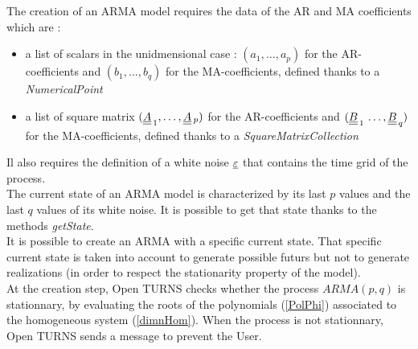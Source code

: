 \renewcommand{\filename}{docUC_StocProc_ARMA_Creation.tex}
\renewcommand{\filetitle}{UC : Creation of an ARMA model}

\HeaderIIILevel

\label{ARMACreation}






The creation of an ARMA model requires the data of the AR and MA coefficients which are : 
\begin{itemize}
\item a list of scalars in the unidmensional case : $(a_1, \hdots, a_p)$ for the AR-coefficients and  $(b_1, \hdots, b_q)$ for the MA-coefficients, defined thanks to a \emph{NumericalPoint}
\item a list of square matrix $( {\underline{\underline{A}}}_{\, 1}, \hdots, {\underline{\underline{A}}}{\, _p})$ for the AR-coefficients and  $({\underline{\underline{B}}}_{\, 1}\, \hdots, {\underline{\underline{B}}}_{\, q} )$ for the MA-coefficients, defined thanks to a \emph{SquareMatrixCollection}
\end{itemize}
Il also requires the definition of a white noise $ {\underline{\varepsilon}}$ that contains the  time grid of the process.\\

The current state of an ARMA model is characterized by its last $p$ values and the last $q$ values of its white noise. It is possible to get that state thanks to the methods \emph{getState}. \\



It is possible to create an ARMA with a specific current state. That specific current state is  taken into account to  generate possible futurs but not to generate realizations (in order to respect the stationarity property of the model).\\

At the creation step, Open TURNS checks whether the process $ARMA(p,q)$ is stationnary, by evaluating the roots of the polynomials (\ref{PolPhi})  associated to the homogeneous system (\ref{dimnHom}). When the process is not stationnary, Open TURNS sends a message to prevent the User.\\


